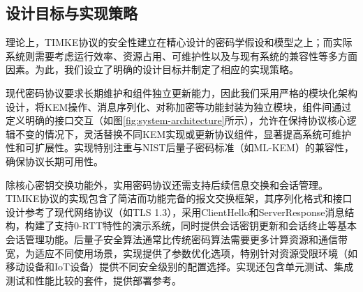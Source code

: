 \subsection{设计目标与实现策略}

理论上，TIMKE协议的安全性建立在精心设计的密码学假设和模型之上；而实际系统则需要考虑运行效率、资源占用、可维护性以及与现有系统的兼容性等多方面因素。为此，我们设立了明确的设计目标并制定了相应的实现策略。

现代密码协议要求长期维护和组件独立更新能力，因此我们采用严格的模块化架构设计，将KEM操作、消息序列化、对称加密等功能封装为独立模块，组件间通过定义明确的接口交互（如图\ref{fig:system-architecture}所示），允许在保持协议核心逻辑不变的情况下，灵活替换不同KEM实现或更新协议组件，显著提高系统可维护性和可扩展性。实现特别注重与NIST后量子密码标准（如ML-KEM）的兼容性，确保协议长期可用性。

除核心密钥交换功能外，实用密码协议还需支持后续信息交换和会话管理。TIMKE协议的实现包含了简洁而功能完备的报文交换框架，其序列化格式和接口设计参考了现代网络协议（如TLS 1.3），采用ClientHello和ServerResponse消息结构，构建了支持0-RTT特性的演示系统，同时提供会话密钥更新和会话终止等基本会话管理功能。后量子安全算法通常比传统密码算法需要更多计算资源和通信带宽，为适应不同使用场景，实现提供了参数优化选项，特别针对资源受限环境（如移动设备和IoT设备）提供不同安全级别的配置选择。实现还包含单元测试、集成测试和性能比较的套件，提供部署参考。
